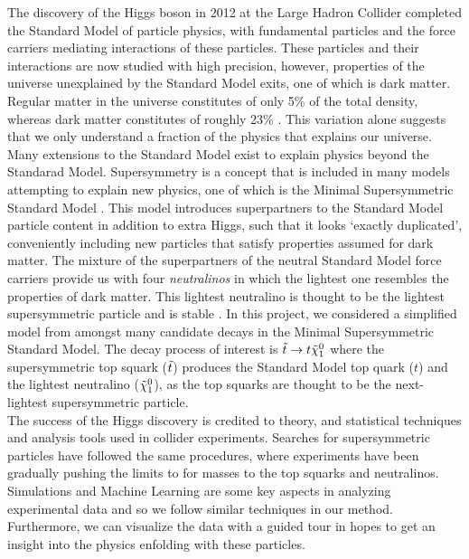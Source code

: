 The discovery of the Higgs boson in 2012 at the Large Hadron Collider \cite{chatrchyan2012observation,aad2012observation} completed the Standard Model of particle physics, with fundamental particles and the force carriers mediating interactions of these particles. These particles and their interactions are now studied with high precision, however, properties of the universe unexplained by the Standard Model exits, one of which is dark matter. Regular matter in the universe constitutes of only 5\% of the total density, whereas dark matter constitutes of roughly 23\% \cite{thomson2013modern}. This variation alone suggests that we only understand a fraction of the physics that explains our universe.  \\

Many extensions to the Standard Model exist to explain physics beyond the Standarad Model. Supersymmetry is a concept that is included in many models attempting to explain new physics, one of which is the Minimal Supersymmetric Standard Model \cite{martin1997supersymmetry}. This model introduces superpartners to the Standard Model particle content in addition to extra Higgs, such that it looks `exactly duplicated', conveniently including new particles that satisfy properties assumed for dark matter. The mixture of the superpartners of the neutral Standard Model force carriers provide us with four \textit{neutralinos} in which the lightest one resembles the properties of dark matter. This lightest neutralino is thought to be the lightest supersymmetric particle and is stable \cite{martin1997supersymmetry}. In this project, we considered a simplified model from amongst many candidate decays in the Minimal Supersymmetric Standard Model. The decay process of interest is $\Tilde{t}\rightarrow t\Tilde{\chi}_1^0$ where the supersymmetric top squark ($\Tilde{t}$) produces the Standard Model top quark ($t$) and the lightest neutralino ($\Tilde{\chi}_1^0$), as the top squarks are thought to be the next-lightest supersymmetric particle. \\

The success of the Higgs discovery is credited to theory, and statistical techniques and analysis tools used in collider experiments. Searches for supersymmetric particles have followed the same procedures, where experiments have been gradually pushing the limits to for masses to the top squarks and neutralinos. Simulations and Machine Learning are some key aspects in analyzing experimental data and so we follow similar techniques in our method. Furthermore, we can visualize the data with a guided tour in hopes to get an insight into the physics enfolding with these particles. \\

